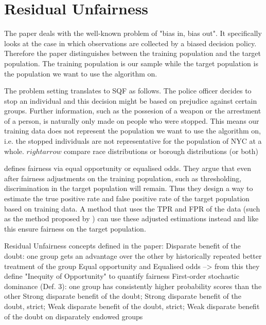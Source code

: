 \section*{Residual Unfairness}
The paper deals with the well-known problem of "bias in, bias out". It specifically looks at the case in which observations are collected by a biased decision policy. Therefore the paper distinguishes between the training population and the target population. The training population is our sample while the target population is the population we want to use the algorithm on. 


The problem setting translates to SQF as follows. The police officer decides to stop an individual and this decision might be based on prejudice against certain groups. Further information, such as the possesion of a weapon or the arrestment of a person, is naturally only made on people who were stopped.
This means our training data does not represent the population we want to use the algorithm on, i.e. the stopped individuals are not representative for the population of NYC at a whole. $rightarrow$ compare race distributions or borough distributions (or both)


\cite{kallus} defines fairness via equal opportunity or equalised odds. They argue that even after fairness adjustments on the training population, such as thresholding, discrimination in the target population will remain.
Thus they design a way to estimate the true positive rate and false positive rate of the target population based on training data. A method that uses the TPR and FPR of the data (such as the method proposed by \cite{hardt2016}) can use these adjusted estimations instead and like this ensure fairness on the target population.



Residual Unfairness \cite{kallus} concepts defined in the paper:
Disparate benefit of the doubt: one group gets an advantage over the other by historically repeated better treatment of the group
Equal opportunity and Equalised odds --> from this they define "Inequity of Opportunity" to quantify fairness
First-order stochastic dominance (Def. 3): one group has consistently higher probability scores than the other
Strong disparate benefit of the doubt; Strong disparate benefit of the doubt,  strict;
Weak disparate benefit of the doubt, strict; Weak disparate benefit of the doubt on disparately endowed groups

